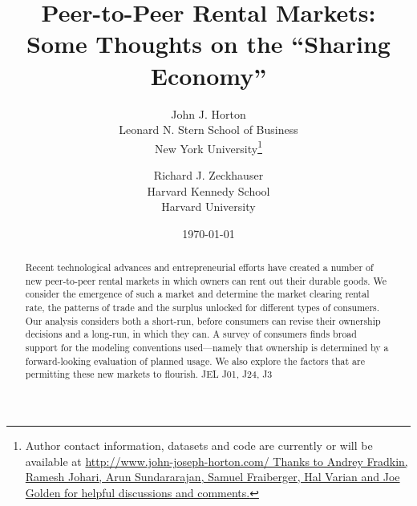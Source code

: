 \documentclass[11pt]{article}
\newcommand{\important}[1]{\textcolor{red}{\textbf{#1}}}
\newcommand{\important}[1]{#1}
\begin{document}
 

\title{Peer-to-Peer Rental Markets:\\
Some Thoughts on the ``Sharing Economy''}

\date{\today}

\author{John J. Horton \\ Leonard N. Stern School of Business \\ New
  York University\footnote{Author contact information, datasets and
    code are currently or will be available at
    \href{http://www.john-joseph-horton.com/}{http://www.john-joseph-horton.com/
    Thanks to Andrey Fradkin, Ramesh Johari, Arun Sundararajan, Samuel Fraiberger, Hal Varian and Joe Golden for helpful discussions and comments.}}
  \and 
  Richard J. Zeckhauser \\ Harvard Kennedy School \\ Harvard University
}
\maketitle


\begin{abstract} 
Recent technological advances and entrepreneurial efforts have created a number of new peer-to-peer rental markets in which owners can rent out their durable goods. 
We consider the emergence of such a market and determine the market clearing rental rate, the patterns of trade and the surplus unlocked for different types of consumers. 
Our analysis considers both a short-run, before consumers can revise their ownership decisions and a long-run, in which they can. 
A survey of consumers finds broad support for the modeling conventions
used---namely that ownership is determined by a forward-looking evaluation of planned usage.
We also explore the factors that are permitting these new markets to flourish. 
\newline \newline 
\noindent JEL J01, J24, J3 
\end{abstract} 

\onehalfspacing

\end{document}
